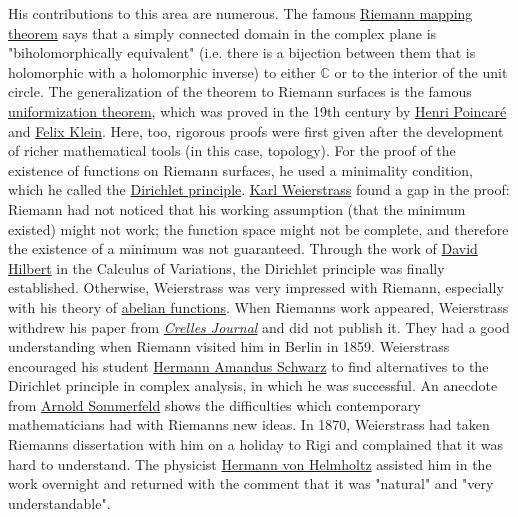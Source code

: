 His contributions to this area are numerous. The famous \href{https://en.wikipedia.org/wiki/Riemann_mapping_theorem}{Riemann mapping theorem} says that a simply connected domain in the complex plane is "biholomorphically equivalent" (i.e. there is a bijection between them that is holomorphic with a holomorphic inverse) to either {{\(\mathbb{C}\)}{}} or to the interior of the unit circle. The generalization of the theorem to Riemann surfaces is the famous \href{https://en.wikipedia.org/wiki/Uniformization_theorem}{uniformization theorem}, which was proved in the 19th century by \href{https://en.wikipedia.org/wiki/Henri_Poincaré}{Henri Poincaré} and \href{https://en.wikipedia.org/wiki/Felix_Klein}{Felix Klein}. Here, too, rigorous proofs were first given after the development of richer mathematical tools (in this case, topology). For the proof of the existence of functions on Riemann surfaces, he used a minimality condition, which he called the \href{https://en.wikipedia.org/wiki/Dirichlet_principle}{Dirichlet principle}. \href{https://en.wikipedia.org/wiki/Karl_Weierstrass}{Karl Weierstrass} found a gap in the proof: Riemann had not noticed that his working assumption (that the minimum existed) might not work; the function space might not be complete, and therefore the existence of a minimum was not guaranteed. Through the work of \href{https://en.wikipedia.org/wiki/David_Hilbert}{David Hilbert} in the Calculus of Variations, the Dirichlet principle was finally established. Otherwise, Weierstrass was very impressed with Riemann, especially with his theory of \href{https://en.wikipedia.org/wiki/Abelian_function}{abelian functions}. When Riemann\textquotesingle s work appeared, Weierstrass withdrew his paper from \emph{\href{https://en.wikipedia.org/wiki/Crelle's_Journal}{Crelle\textquotesingle s Journal}} and did not publish it. They had a good understanding when Riemann visited him in Berlin in 1859. Weierstrass encouraged his student \href{https://en.wikipedia.org/wiki/Hermann_Amandus_Schwarz}{Hermann Amandus Schwarz} to find alternatives to the Dirichlet principle in complex analysis, in which he was successful. An anecdote from \href{https://en.wikipedia.org/wiki/Arnold_Sommerfeld}{Arnold Sommerfeld} shows the difficulties which contemporary mathematicians had with Riemann\textquotesingle s new ideas. In 1870, Weierstrass had taken Riemann\textquotesingle s dissertation with him on a holiday to Rigi and complained that it was hard to understand. The physicist \href{https://en.wikipedia.org/wiki/Hermann_von_Helmholtz}{Hermann von Helmholtz} assisted him in the work overnight and returned with the comment that it was "natural" and "very understandable".

